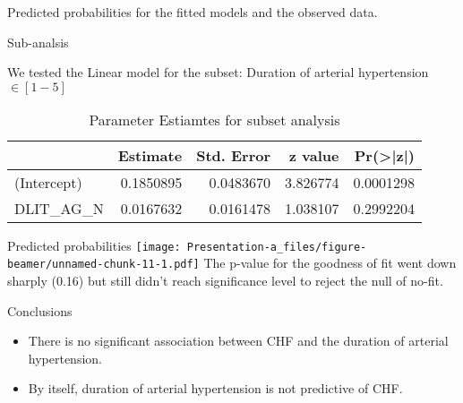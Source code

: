 \documentclass[
  ignorenonframetext,
]{beamer}
\providecommand{\tightlist}{%
  \setlength{\itemsep}{0pt}\setlength{\parskip}{0pt}}
\begin{document}
\begin{frame}{}
\protect\hypertarget{section-2}{}

Predicted probabilities for the fitted models and the observed data.

\end{frame}

\begin{frame}{Sub-analsis}
\protect\hypertarget{sub-analsis}{}

We tested the Linear model for the subset: Duration of arterial
hypertension \(\in[1 - 5]\)

\begin{table}

\caption{\label{tab:unnamed-chunk-10}Parameter Estiamtes for subset analysis}
\centering
\begin{tabular}[t]{l|r|r|r|r}
\hline
  & Estimate & Std. Error & z value & Pr(>|z|)\\
\hline
(Intercept) & 0.1850895 & 0.0483670 & 3.826774 & 0.0001298\\
\hline
DLIT\_AG\_N & 0.0167632 & 0.0161478 & 1.038107 & 0.2992204\\
\hline
\end{tabular}
\end{table}

\end{frame}

\begin{frame}{}
\protect\hypertarget{section-3}{}

Predicted probabilities
\texttt{[image: Presentation-a\_files/figure-beamer/unnamed-chunk-11-1.pdf]}
The p-value for the goodness of fit went down sharply (0.16) but still
didn't reach significance level to reject the null of no-fit.

\end{frame}

\begin{frame}{Conclusions}
\protect\hypertarget{conclusions}{}

\begin{itemize}
\tightlist
\item
  There is no significant association between CHF and the duration of
  arterial hypertension.
\item
  By itself, duration of arterial hypertension is not predictive of CHF.
\end{itemize}

\end{frame}
\end{document}
